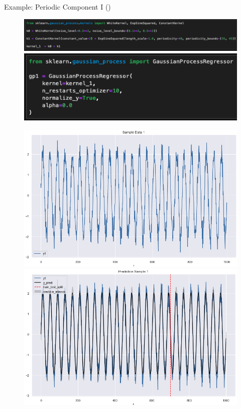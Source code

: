 \documentclass[10pt]{beamer}
\begin{document}
\begin{frame}{Example: Periodic Component I (\cite{gaussian_process_time_series_2019})}{\cite[Section 1.7. Gaussian Processes]{scikitlearn}}
\begin{center}
\begin{figure}
\includegraphics[scale=0.3]{images/code_kernel_1_example3.png}
\includegraphics[scale=0.3]{images/gp1_example3.png}
\end{figure}
\end{center}
\begin{center}
\begin{figure}
\includegraphics[scale=0.20]{images/sample_1_example3.png}
\includegraphics[scale=0.20]{images/pred_1_example3.png}
\end{figure}
\end{center}
\end{frame}
\end{document}
